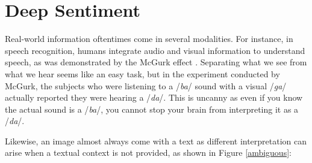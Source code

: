 \chapter{Deep Sentiment}

Real-world information oftentimes come in several modalities. For instance, in speech recognition, humans integrate audio and visual information to understand speech, as was demonstrated by the McGurk effect \cite{mcgurk}. Separating what we see from what we hear seems like an easy task, but in the experiment conducted by McGurk, the subjects who were listening to a /{\em ba}/ sound with a visual /{\em ga}/ actually reported they were hearing a /{\em da}/. This is uncanny as even if you know the actual sound is a /{\em ba}/, you cannot stop your brain from interpreting it as a /{\em da}/.

Likewise, an image almost always come with a text as different interpretation can arise when a textual context is not provided, as shown in Figure \ref{ambiguous}:

